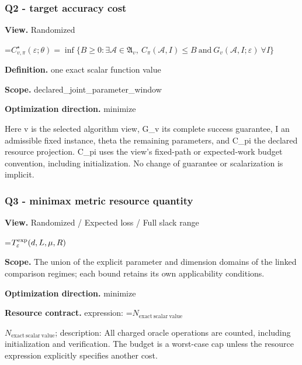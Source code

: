 \documentclass[10pt,a4paper]{article}
\newcommand{\AtlasMath}[1]{\par\begingroup\centering\setbox0=\hbox{$\displaystyle #1$}\ifdim\wd0>1.4\linewidth\typeout{ATLAS WIDE FORMULA: \the\wd0}\fi\ifdim\wd0>\linewidth\resizebox{\linewidth}{!}{\box0}\else\box0\fi\par\endgroup}
\newcommand{\AtlasInlineMath}[1]{\begingroup\setbox0=\hbox{$#1$}\ifdim\wd0>.4\linewidth\endgroup\AtlasMath{#1}\else\endgroup$#1$\fi}
\begin{document}
\subsubsection{Q2 - target accuracy cost}


\textbf{View.} Randomized



\AtlasMath{C^\star_{v,\pi}(\varepsilon;\theta)=\inf\{B\ge0:\exists\mathcal A\in\mathfrak A_v,\ C_\pi(\mathcal A,I)\le B\ \text{and}\ G_v(\mathcal A,I;\varepsilon)\ \forall I\}}


\textbf{Definition.} one exact scalar function value



\textbf{Scope.} declared\_joint\_parameter\_window



\textbf{Optimization direction.} minimize



Here v is the selected algorithm view, G\_v its complete success guarantee, I an admissible fixed instance, theta the remaining parameters, and C\_pi the declared resource projection. C\_pi uses the view's fixed-path or expected-work budget convention, including initialization. No change of guarantee or scalarization is implicit.



\subsubsection{Q3 - minimax metric resource quantity}


\textbf{View.} Randomized / Expected loss / Full slack range



\AtlasMath{T_\varepsilon^{\rm exp}(d,L,\mu,R)}


\textbf{Scope.} The union of the explicit parameter and dimension domains of the linked comparison regimes; each bound retains its own applicability conditions.



\textbf{Optimization direction.} minimize



\textbf{Resource contract.} expression: \AtlasInlineMath{N_{\mathrm{exact\ scalar\ value}}}; description: All charged oracle operations are counted, including initialization and verification. The budget is a worst-case cap unless the resource expression explicitly specifies another cost.
\end{document}
